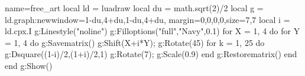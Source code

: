 \begin{luadraw}{name=free_art}
local ld = luadraw
local du = math.sqrt(2)/2
local g = ld.graph:new{window={1-du,4+du,1-du,4+du},
    margin={0,0,0,0},size={7,7}}
local i = ld.cpx.I
g:Linestyle("noline")
g:Filloptions("full","Navy",0.1)
for X = 1, 4 do
    for Y = 1, 4 do
        g:Savematrix()
        g:Shift(X+i*Y); g:Rotate(45)
        for k = 1, 25 do
            g:Dsquare((1-i)/2,(1+i)/2,1)
            g:Rotate(7); g:Scale(0.9)
        end
        g:Restorematrix()
    end
end
g:Show()
\end{luadraw}
